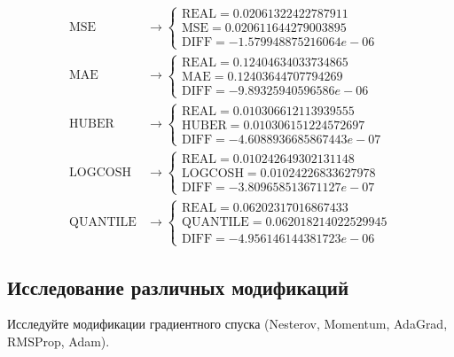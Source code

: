 \documentclass[12pt, a4paper, oneside, final]{article}
\begin{document}
	\begin{align*}
		\text{MSE} &\to
		\begin{cases}
			\text{REAL} = 0.02061322422787911 \\
			\text{MSE} = 0.020611644279003895 \\
			\text{DIFF} = -1.579948875216064e-06
		\end{cases} \\
		\text{MAE} &\to
		\begin{cases}
			\text{REAL} = 0.12404634033734865 \\
			\text{MAE} = 0.12403644707794269 \\
			\text{DIFF} = -9.89325940596586e-06
		\end{cases} \\
		\text{HUBER} &\to
		\begin{cases}
			\text{REAL} = 0.010306612113939555 \\
			\text{HUBER} = 0.010306151224572697 \\
			\text{DIFF} = -4.6088936685867443e-07
		\end{cases} \\
		\text{LOGCOSH} &\to
		\begin{cases}
			\text{REAL} = 0.010242649302131148 \\
			\text{LOGCOSH} = 0.01024226833627978 \\
			\text{DIFF} = -3.809658513671127e-07
		\end{cases} \\
		\text{QUANTILE} &\to
		\begin{cases}
			\text{REAL} = 0.06202317016867433 \\
			\text{QUANTILE} = 0.062018214022529945 \\
			\text{DIFF} = -4.956146144381723e-06
		\end{cases}
	\end{align*}
	\subsection*{Исследование различных модификаций}
	Исследуйте модификации градиентного спуска (Nesterov, Momentum, AdaGrad, RMSProp, Adam).
\end{document}
